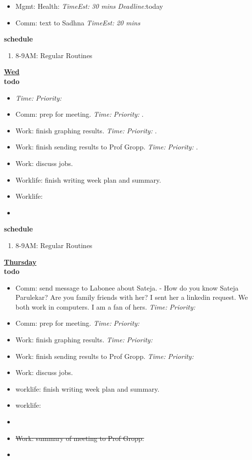 \documentclass[11pt]{article}
\newcommand{\doneTask}[1]{\item \sout{#1}}
\newcommand{\timeEst}[1]{\textit{Time:} \textit{#1}}
\newcommand{\te}[1]{\textit{TimeEst:} \textit{#1}}
\newcommand{\priority}[1]{\textit{Priority:} \textit{#1}}
\newcommand{\deadline}[1]{#1}
\newcommand{\dl}[1]{\textit{Deadline:}#1}
\begin{document}
{\begin{itemize}
\item \tiny Mgmt: Health:  \te{30 mins}  \dl{today}  
\item \tiny Comm: text to Sadhna \te{20 mins} 
\end{itemize}
\textbf{\small schedule} \\
  \begin{enumerate}
    \tiny \item \tiny 8-9AM: Regular Routines 
  \end{enumerate} 
\textbf{\small \underline{Wed}} \\
\textbf{\small todo} \\
\begin{itemize}
\tiny \item \tiny \deadline{} \timeEst{} \priority{} 
  \tiny \item \tiny Comm: prep for meeting. \deadline{} \timeEst{} \priority{}. 
  \item \tiny Work: finish graphing results.  \deadline{ }   \timeEst{}  \priority{}.
  \item \tiny Work: finish sending results to Prof Gropp.  \deadline{ }   \timeEst{}  \priority{}. 
  \item \tiny Work: discuss jobs.  
  \item \tiny Worklife: finish writing week plan and summary. 
  \item \tiny Worklife: 
    \item \tiny
\end{itemize} 
\textbf{\small schedule} \\
  \begin{enumerate}
    \tiny \item \tiny 8-9AM: Regular Routines 
  \end{enumerate} 
  \textbf{\small \underline{Thursday}} \\
  \textbf{\small todo} \\
  \begin{itemize}
    \tiny \item \tiny Comm: send message to Labonee about Sateja. - How do you know Sateja Parulekar? Are you family friends with her? I sent her a linkedin request. We both work in computers. I am a fan of hers. \deadline{} \timeEst{} \priority{}  
    \tiny \item \tiny Comm: prep for meeting. \deadline{} \timeEst{} \priority{}  
  \item \tiny Work: finish graphing results.  \deadline{ }   \timeEst{}  \priority{}
  \item \tiny Work: finish sending results to Prof Gropp.  \deadline{ }   \timeEst{}  \priority{}  
  \item \tiny Work: discuss jobs.  
  \item \tiny worklife: finish writing week plan and summary. 
  \item \tiny worklife: 
  \item \tiny \doneTask{Work: summary of meeting to Prof Gropp.} 
  \item \tiny 
  \end{itemize}

}
\end{document}
